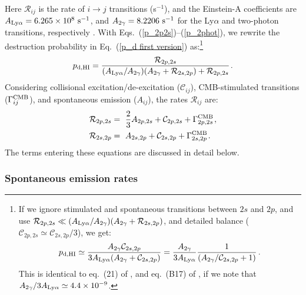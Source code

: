 \documentclass[fleqn,usenatbib]{mnras}
\begin{document}
Here $\mathcal{R}_{ij}$ is the rate of $i \rightarrow j$ transitions (s$^{-1}$), and the Einstein-A coefficients are $A_{\rm Ly\alpha} = 6.265 \times 10^{8} ~ \rm s^{-1}$, and $A_{2\gamma} = 8.2206 ~ \rm s^{-1}$ for the Ly$\alpha$ and two-photon transitions, respectively \citep[e.g.][and references therein]{Draine2011, Chluba2008}. With Eqs.~(\ref{p_2p2s})--(\ref{p_2phot}), we rewrite the destruction probability in Eq.~(\ref{p_d first version}) as:\footnote{If we ignore stimulated and spontaneous transitions between $2s$ and $2p$, and use $\mathcal{R}_{2p,2s} \ll (A_{\rm Ly\alpha}/A_{2\gamma})(A_{2\gamma} + \mathcal{R}_{2s,2p})$, and detailed balance ($\mathcal{C}_{2p,2s} \simeq \mathcal{C}_{2s,2p}/3$), we get:
\begin{equation}
    p_{\rm d,HI} \simeq \dfrac{A_{2\gamma} \mathcal{C}_{2s,2p}}{3A_{\rm Ly\alpha}(A_{2\gamma} +  \mathcal{C}_{2s,2p})} = \dfrac{A_{2\gamma}}{3 A_{\rm Ly\alpha}} \dfrac{1}{(A_{2\gamma}/\mathcal{C}_{2s,2p} + 1)} \, \nonumber.
\end{equation}
This is identical to eq.~(21) of \cite{Spitzer1951}, and eq.~(B17) of \cite{McKee2008}, if we note that $A_{2\gamma}/3A_{\rm Ly\alpha} \simeq 4.4 \times 10^{-9}$. }
\begin{equation}
    p_{\rm d, HI} = \frac{\mathcal{R}_{2p,2s}}{(A_{\rm Ly \alpha}/A_{2 \gamma})( A_{2 \gamma} + \mathcal{R}_{2s,2p}) + \mathcal{R}_{2p,2s}} \hspace{1 pt} \label{p_d general}.
\end{equation}
Considering collisional excitation/de-excitation ($\mathcal{C}_{ij}$), CMB-stimulated transitions ($\Gamma_{ij}^{\rm CMB}$), and spontaneous emission ($A_{ij}$), the rates $\mathcal{R}_{ij}$ are:
\begin{align}
    \mathcal{R}_{2p,2s} &=~ \dfrac{2}{3} A_{2p,2s} + \mathcal{C}_{2p,2s} + \Gamma_{2p,2s}^{\rm CMB} \hspace{1 pt} \label{R2p2s}, \\  \mathcal{R}_{2s,2p} &=~ A_{2s,2p} + \mathcal{C}_{2s,2p} + \Gamma_{2s,2p}^{\rm CMB} \hspace{1 pt} \label{R2s2p} .
\end{align}
The terms entering these equations are discussed in detail below.

\subsubsection{Spontaneous emission rates}
\end{document}
